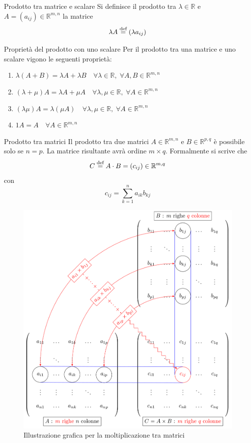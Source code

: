 \begin{Def}{Prodotto tra matrice e scalare}\label{def:matrice_prodotto_scalare}
  Si definisce il prodotto tra $\lambda\in\mathbb{R}$ e $A=(a_{ij})\in\mathbb{R}^{m,n}$
  la matrice
  \begin{equation*}
    \lambda A\overset{\text{def}}{=}(\lambda a_{ij})
  \end{equation*}
\end{Def}

\begin{SubDef}{Proprietà del prodotto con uno scalare}
  Per il prodotto tra una matrice e uno scalare vigono le seguenti proprietà:
  \begin{enumerate}
    \item $\lambda(A+B) = \lambda A + \lambda B\quad\forall\lambda\in\mathbb{R},\;
      \forall A,B\in\mathbb{R}^{m,n}$
    \item $(\lambda+\mu)A = \lambda A + \mu A\quad\forall\lambda,\mu\in\mathbb{R},\;
      \forall A\in\mathbb{R}^{m,n}$
    \item $(\lambda\mu)A = \lambda(\mu A)\quad\forall\lambda,\mu\in\mathbb{R},\;
      \forall A\in\mathbb{R}^{m,n}$
    \item $1A = A\quad\forall A\in\mathbb{R}^{m,n}$
  \end{enumerate}
\end{SubDef}

\begin{Def}{Prodotto tra matrici}\label{def:matrice_prodotto}
  Il prodotto tra due matrici $A\in\mathbb{R}^{m,n}$ e $B\in\mathbb{R}^{p,q}$ è
  possibile solo se $n=p$. La matrice risultante avrà ordine $m\times q$.
  Formalmente si scrive che
  \begin{equation*}
    C \overset{\text{def}}{=} A\cdot B = (c_{ij})\in\mathbb{R}^{m,q}
  \end{equation*}
  con
  \begin{equation*}
    c_{ij} = \sum^{n}_{k=1} a_{ik}b_{kj}
  \end{equation*}
  \begin{figure}[!htbp]
    \centering
    \includegraphics[width=0.6\linewidth]{images/matrMult.png}
    \caption{Illustrazione grafica per la moltiplicazione tra matrici}
    \label{fig:matrMult}
  \end{figure}
\end{Def}

